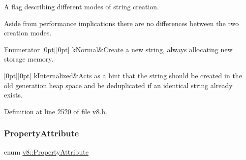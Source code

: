 A flag describing different modes of string creation.

Aside from performance implications there are no differences between the two creation modes. \begin{DoxyEnumFields}{Enumerator}
[0pt][0pt]{}\mbox{\label{namespacev8_ac9163ab12fb3b2a95907a3a0367c6095a07fa7a19aa722c635a15e94cb7f50416}} 
k\+Normal&Create a new string, always allocating new storage memory. \\
\hline

[0pt][0pt]{}\mbox{\label{namespacev8_ac9163ab12fb3b2a95907a3a0367c6095ade6a7f11cd845d59e52b388d18929295}} 
k\+Internalized&Acts as a hint that the string should be created in the old generation heap space and be deduplicated if an identical string already exists. \\
\hline

\end{DoxyEnumFields}


Definition at line 2520 of file v8.\+h.

\mbox{\label{namespacev8_a05f25f935e108a1ea2d150e274602b87}} 
\subsubsection{\texorpdfstring{Property\+Attribute}{PropertyAttribute}}
{\footnotesize\ttfamily enum \mbox{\hyperlink{namespacev8_a05f25f935e108a1ea2d150e274602b87}{v8\+::\+Property\+Attribute}}}

